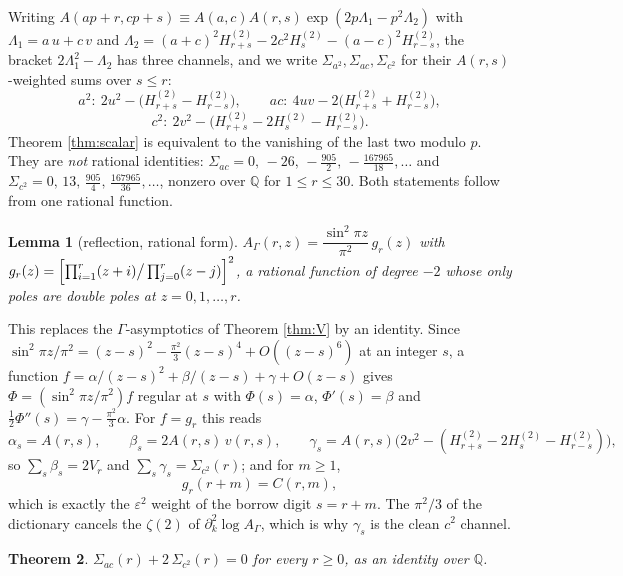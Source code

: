 \documentclass[11pt,a4paper]{amsart}
\theoremstyle{plain}
\newtheorem{theorem}{Theorem}[section]
\newtheorem{lemma}[theorem]{Lemma}
\theoremstyle{definition}
\theoremstyle{remark}
\newcommand{\QQ}{\mathbb{Q}}
\newcommand{\A}{A}
\begin{document}
Writing $\A(ap+r,cp+s)\equiv \A(a,c)\A(r,s)\exp(2p\Lambda_1-p^2\Lambda_2)$ with
$\Lambda_1=a\,u+c\,v$ and
$\Lambda_2=(a+c)^2H^{(2)}_{r+s}-2c^2H^{(2)}_s-(a-c)^2H^{(2)}_{r-s}$, the bracket
$2\Lambda_1^2-\Lambda_2$ has three channels, and we write $\Sigma_{a^2},\Sigma_{ac},
\Sigma_{c^2}$ for their $\A(r,s)$-weighted sums over $s\le r$:
\[
  a^2:\ 2u^2-\bigl(H^{(2)}_{r+s}-H^{(2)}_{r-s}\bigr),\qquad
  ac:\ 4uv-2\bigl(H^{(2)}_{r+s}+H^{(2)}_{r-s}\bigr),
\]
\[
  c^2:\ 2v^2-\bigl(H^{(2)}_{r+s}-2H^{(2)}_s-H^{(2)}_{r-s}\bigr).
\]
Theorem \ref{thm:scalar} is equivalent to the vanishing of the last two modulo $p$. They
are \emph{not} rational identities: $\Sigma_{ac}=0,\,-26,\,-\tfrac{905}2,\,
-\tfrac{167965}{18},\dots$ and $\Sigma_{c^2}=0,\,13,\,\tfrac{905}4,\,
\tfrac{167965}{36},\dots$, nonzero over $\QQ$ for $1\le r\le30$. Both statements follow
from one rational function.

\begin{lemma}[reflection, rational form]\label{lem:grat}
$\A_\Gamma(r,z)=\dfrac{\sin^2\pi z}{\pi^2}\,g_r(z)$ with
$g_r(z)=\Bigl[\prod_{i=1}^{r}(z+i)\big/\prod_{j=0}^{r}(z-j)\Bigr]^2$, a rational
function of degree $-2$ whose only poles are double poles at $z=0,1,\dots,r$.
\end{lemma}

This replaces the $\Gamma$-asymptotics of Theorem \ref{thm:V} by an identity. Since
$\sin^2\pi z/\pi^2=(z-s)^2-\tfrac{\pi^2}3(z-s)^4+O((z-s)^6)$ at an integer $s$, a
function $f=\alpha/(z-s)^2+\beta/(z-s)+\gamma+O(z-s)$ gives
$\Phi=(\sin^2\pi z/\pi^2)f$ regular at $s$ with $\Phi(s)=\alpha$, $\Phi'(s)=\beta$ and
$\tfrac12\Phi''(s)=\gamma-\tfrac{\pi^2}3\alpha$. For $f=g_r$ this reads
\[
  \alpha_s=\A(r,s),\qquad \beta_s=2\A(r,s)\,v(r,s),\qquad
  \gamma_s=\A(r,s)\bigl(2v^2-(H^{(2)}_{r+s}-2H^{(2)}_s-H^{(2)}_{r-s})\bigr),
\]
so $\sum_s\beta_s=2V_r$ and $\sum_s\gamma_s=\Sigma_{c^2}(r)$; and for $m\ge1$,
\[
  g_r(r+m)=C(r,m),
\]
which is exactly the $\varepsilon^2$ weight of the borrow digit $s=r+m$. The $\pi^2/3$
of the dictionary cancels the $\zeta(2)$ of $\partial_k^2\log\A_\Gamma$, which is why
$\gamma_s$ is the clean $c^2$ channel.

\begin{theorem}\label{thm:R1}
$\Sigma_{ac}(r)+2\,\Sigma_{c^2}(r)=0$ for every $r\ge0$, as an identity over $\QQ$.
\end{theorem}
\end{document}
